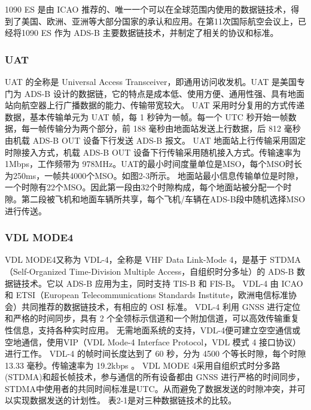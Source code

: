 
1090  ES 是由 ICAO 推荐的、唯一一个可以在全球范围内使用的数据链技术，得到了美国、欧洲、亚洲等大部分国家的承认和应用。在第11次国际航空会议上，已经将1090 ES 作为 ADS-B 主要数据链技术，并制定了相关的协议和标准\cite{yang2011jiyu}。
\subsubsection{UAT}
UAT 的全称是 Universal Access Transceiver，即通用访问收发机。UAT 是美国专门为 ADS-B 设计的数据链，它的特点是成本低、使用方便、通用性强、具有地面站向航空器上行广播数据的能力、传输带宽较大\cite{li2012jiyu}。 UAT 采用时分复用的方式传递数据，基本传输单元为 UAT 帧，每 1 秒钟为一帧。每一个 UTC 秒开始一帧数据，每一帧传输分为两个部分，前 188 毫秒由地面站发送上行数据，后 812 毫秒由机载 ADS-B OUT 设备下行发送 ADS-B 报文\cite{lv2007adsb}。 UAT 地面站上行传输采用固定时隙接入方式，机载 ADS-B OUT 设备下行传输采用随机接入方式。传输速率为 1Mbps，工作频带为 978MHz。UAT的最小时间度量单位是MSO，每个MSO时长为250ms，一帧共4000个MSO。如图2-3所示。 地面站最小信息传输单位是时隙，一个时隙有22个MSO。因此第一段由32个时隙构成，每个地面站被分配一个时隙。第二段被飞机和地面车辆所共享，每个飞机/车辆在ADS-B段中随机选择MSO进行传送。
 

\subsubsection{VDL MODE4}
VDL MODE4又称为 VDL-4，全称是 VHF Data Link-Mode 4，是基于 STDMA（Self-Organized Time-Division Multiple Access，自组织时分多址）的 ADS-B 数据链技术\cite{ding2010jiyu}。它以 ADS-B 应用为主，同时支持 TIS-B 和 FIS-B。 VDL-4 由 ICAO 和 ETSI（European Telecommunications Standards Institute，欧洲电信标准协会）共同推荐的数据链技术，有相应的 OSI 标准。 VDL-4 利用 GNSS 进行定位和严格的时间同步，具有 2 个全领标示信道和一个附加信道，可以高效传输重复性信息，支持各种实时应用\cite{qiu2011adsb}。 无需地面系统的支持，VDL-4便可建立空空通信或空地通信，使用VIP（VDL Mode-4 Interface Protocol，VDL 模式 4 接口协议）进行工作。 VDL-4 的帧时间长度达到了 60 秒，分为 4500 个等长时隙，每个时隙 13.33 毫秒。传输速率为 19.2kbps 。 VDL MODE 4采用自组织式时分多路(STDMA)和超长帧技术，参与通信的所有设备都由 GNSS 进行严格的时间同步，STDMA中使用者的共同时间标准是UTC。从而避免了数据发送的时隙冲突，并可以实现数据发送的计划性。
表2-1是对三种数据链技术的比较\cite{su2007sanzhong}。 

